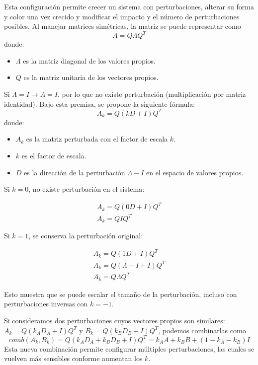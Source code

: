Esta configuración permite crecer un sistema con perturbaciones, alterar su forma y color una vez crecido y modificar el impacto y el número de perturbaciones posibles. Al manejar matrices simétricas, la matriz se puede representar como 
\[A = Q \Lambda Q^T\] 
donde: 

\begin{itemize}
	
	\item $\Lambda$ es la matriz diagonal de los valores propios.
	
	\item $Q$ es la matriz unitaria de los vectores propios.
	
\end{itemize} 

Si $\Lambda = I \to A = I$, por lo que no existe perturbación (multiplicación por matriz identidad). Bajo esta premisa, se propone la siguiente fórmula:
\[ A_k = Q(kD + I)Q^T\]
donde:

\begin{itemize}
	
	\item $A_k$ es la matriz perturbada con el factor de escala $k$.
	
	\item $k$ es el factor de escala.
	
	\item $D$ es la dirección de la perturbación $\Lambda - I$ en el espacio de valores propios. 
	
\end{itemize}

Si $k = 0$, no existe perturbación en el sistema:

\begin{gather*}
	A_k = Q(0D + I)Q^T \\
	A_k = Q I Q^T
\end{gather*}

Si $k = 1$, se conserva la perturbación original:

\begin{gather*}
	A_k = Q(1D + I)Q^T \\
	A_k = Q(\Lambda - I + I)Q^T \\
	A_k = Q \Lambda Q^T
\end{gather*}

Esto muestra que se puede escalar el tamaño de la perturbación, incluso con perturbaciones inversas con $k = -1$.

Si consideramos dos perturbaciones cuyos vectores propios son similares: $A_k = Q(k_AD_A + I)Q^T$ y $B_k = Q(k_B D_B + I)Q^T$, podemos combinarlas como
\[ comb(A_k, B_k) = Q (k_A D_A + k_B D_B + I) Q^T = k_A A + k_B B + (1 - k_A - k_B) I \]
Esta nueva combinación permite configurar múltiples perturbaciones, las cuales se vuelven más sensibles conforme aumentan los $k$.

